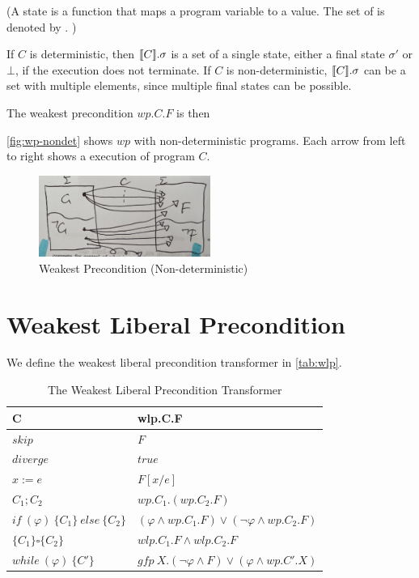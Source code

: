 (A state is a function that maps a program variable to a value. The set of  is denoted by . )

If $C$ is deterministic, then $\llbracket {C} \rrbracket.\sigma$ is a set of a single state, either a final state $\sigma'$ or $\bot$, if the execution does not terminate. 
If $C$ is non-deterministic, $\llbracket {C} \rrbracket.\sigma$ can be a set with multiple elements, since multiple final states can be possible. 

The weakest precondition $wp.C.F$ is then 


\autoref{fig:wp-nondet} shows $wp$ with non-deterministic programs. 
Each arrow from left to right shows a  execution of program $C$. 

\begin{figure}[ht!]\centering
\includegraphics[width=0.5\textwidth]{image/wp-nondet.jpg}
\caption{Weakest Precondition (Non-deterministic)}
\label{fig:wp-nondet}
\end{figure}








\section{Weakest Liberal Precondition}
We define the weakest liberal precondition transformer in \autoref{tab:wlp}. 
\begin{table}[ht!]\centering
    \begin{tabular}{ll}
    \hline\hline
      \textbf{C}&\textbf{wlp.C.F}    \\ \hline
      $skip$&   $F$   \\
      $diverge$&  $true$\\
      $x:= e $&  $F[x/e]$\\
      $C_1;C_2$&  $wp.C_1.(wp.C_2.F)$\\
      $if\ (\varphi)\ \{C_1\}\ else\ \{C_2\} $&  $(\varphi\wedge wp.C_1.F)\vee(\neg\varphi\wedge wp.C_2.F)$\\
      $\{C_1\}\square \{C_2\}$ & $wlp.C_1.F\wedge wlp.C_2.F$\\
      $while\ (\varphi)\ \{C'\}$&  $gfp\ X.(\neg\varphi\wedge F)\vee(\varphi\wedge wp.C'.X)$\\
      \hline\hline
    \end{tabular}
    \caption{The Weakest Liberal Precondition Transformer}
    \label{tab:wlp}
\end{table}

